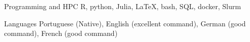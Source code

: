 

\begin{cvskills}

  \cvskill
    {Programming and HPC} %
    {R, python, Julia, LaTeX, bash, SQL, docker, Slurm} %

  \cvskill
    {Languages} %
    {Portuguese (Native), English (excellent command), 
    German (good command), French (good command)} %

\end{cvskills}
